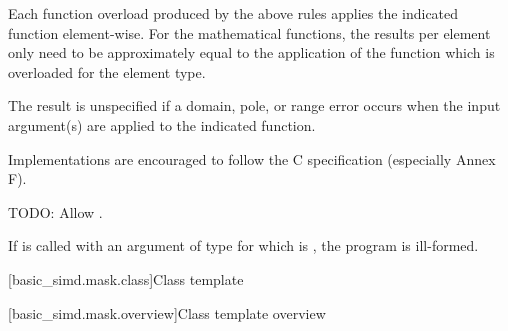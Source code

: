 \pnum
Each function overload produced by the above rules applies the indicated  function element-wise. For the mathematical functions, the results per element only need to be approximately equal to the application of the function which is overloaded for the element type.

\pnum
The result is unspecified if a domain, pole, or range error occurs when the input argument(s) are applied to the indicated  function.
\begin{note}Implementations are encouraged to follow the C specification (especially Annex F).\end{note}

\pnum
TODO: Allow .

\pnum
If  is called with an argument of type  for which  is , the program is ill-formed.

[basic_simd.mask.class]{Class template }

[basic_simd.mask.overview]{Class template  overview}

